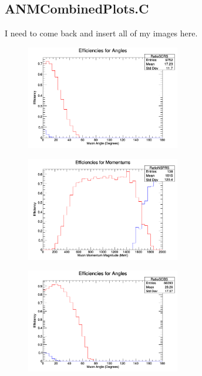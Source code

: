 \documentclass[11pt]{article}
\begin{document}
\subsection{ANMCombinedPlots.C}
I need to come back and insert all of my images here.

\begin{figure}[H]
\centering
\includegraphics[width=0.6\textwidth]{ANMCombinedPlotsImages/1-ANMCombinedPlots.png}
\caption{}
\end{figure}

\begin{figure}[H]
\centering
\includegraphics[width=0.6\textwidth]{ANMCombinedPlotsImages/2-ANMCombinedPlots.png}
\caption{}
\end{figure}

\begin{figure}[H]
\centering
\includegraphics[width=0.6\textwidth]{ANMCombinedPlotsImages/3-ANMCombinedPlots.png}
\caption{}
\end{figure}
\end{document}
